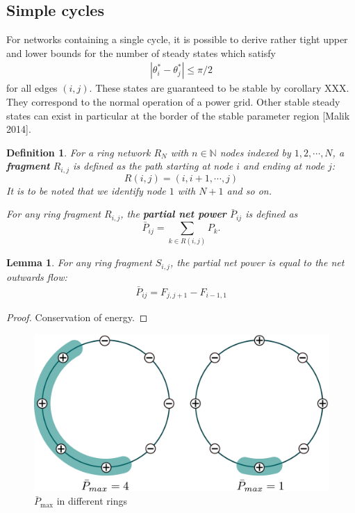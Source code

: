 \documentclass[10pt,aps,pra,onecolumn,superscriptaddress]{revtex4-1}
\newtheorem{defn}[thm]{Definition}
\newtheorem{lemma}{Lemma}
\begin{document}
\subsection{Simple cycles}
\label{sec:cycles}

For networks containing a single cycle, it is possible to derive rather
tight upper and lower bounds for the number of steady states which satisfy
\begin{align}
\label{def:normalop}
|\theta_i^*  - \theta_j^*| \le \pi/2
\end{align}
for all edges $(i,j)$. These states are
guaranteed to be stable by corollary XXX. They correspond to the normal
operation of a power grid. Other stable steady states can exist in particular
at the border of the stable parameter region [Malik 2014].  


\begin{defn}
For a ring network $R_N$ with $n\in \mathbb{N}$ nodes indexed by $1,2,\cdots,N$, a \textbf{fragment} $R_{i,j}$ is 
defined as the path starting at node $i$ and ending at node $j$:
	\[
         R(i,j)=(i,i+1,\cdots, j)
	\]
It is to be noted that we identify node $1$ with $N+1$ and so on.   

For any ring fragment $R_{i,j}$, the \textbf{partial net power} $\bar{P}_{ij}$ is defined as
\[
\bar{P}_{ij}=\sum_{k\in R(i,j)} P_k.  
\]
\end{defn}


\begin{lemma}
\label{lem:flow-power}
For any ring fragment $S_{i,j}$, the partial net power is equal to the net outwards flow:
\begin{align}
\label{eq:glow-power}
\bar{P}_{ij}=F_{j,j+1}-F_{i-1,1}
\end{align}
\end{lemma}

\begin{proof}
Conservation of energy.  
\end{proof}

\begin{figure}[!htp]
\caption{$\bar{P}_{\max}$ in different rings}
\label{fig:pmax}
\begin{center}
\includegraphics[width=0.6\columnwidth]{pics/pmax_compare}
\end{center}
\end{figure}
\end{document}
